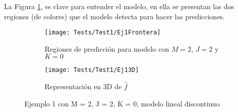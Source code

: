 La Figura \ref{fig:Test1Ej1}, es clave para entender el modelo, en ella se presentan las dos regiones (de colores) que el modelo detecta para hacer las predicciones.

\begin{figure}[h]
	\centering
	\begin{subfigure}[b]{0.45\textwidth}
    	\texttt{[image: Tests/Test1/Ej1Frontera]}
		\caption{Regiones de predicción para modelo con $M = 2$, $J = 2$ y $K = 0$}
	\label{fig:Test1Ej1}
	\end{subfigure}
	\hfill    
    \begin{subfigure}[b]{0.45\textwidth}
        \texttt{[image: Tests/Test1/Ej13D]}
        \caption{Representación en 3D de $\hat{f}$}
        \label{fig:Test1Ej13D}
    \end{subfigure}
    \caption{Ejemplo 1 con M = 2, J = 2, K = 0, modelo lineal discontinuo}
\end{figure}

